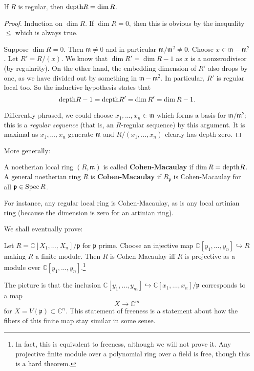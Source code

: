 \begin{example} 
If $R$ is regular, then $\mathrm{depth} R = \dim R$.
\end{example} 
\begin{proof} 
Induction on $\dim R$. If $\dim R=0$, then this is obvious by
the inequality
$\leq $ which is always true.

Suppose $\dim R = 0$. Then $\mathfrak{m} \neq 0$ and in
particular
$\mathfrak{m}/\mathfrak{m}^2 \neq 0$. Choose $x \in \mathfrak{m}
-
\mathfrak{m}^2$. Let $R'=R/(x)$. We know that $\dim R' = \dim
R-1$ as $x$ is a
nonzerodivisor (by regularity). On the other hand, the embedding
dimension of $R'$ also drops
by one, as we have divided out by something in $\mathfrak{m} -
\mathfrak{m}^2$.
In particular, $R'$ is regular local too. So the inductive
hypothesis states
that
\[\mathrm{depth} R-1 =  \mathrm{depth} R' = \dim R' = \dim R -1.   \]

Differently phrased, we could choose $x_1, \dots, x_n \in
\mathfrak{m}$ which forms a basis for
$\mathfrak{m}/\mathfrak{m}^2$; this is a
\emph{regular sequence} (that is, an $R$-regular sequence) by
this argument. It
is maximal as $x_1, \dots, x_n$ generate $\mathfrak{m}$ and
$R/(x_1, \dots,
x_n)$ clearly has depth zero.
\end{proof} 

More generally:
\begin{definition} 
A noetherian local ring $(R, \mathfrak{m})$ is called
\textbf{Cohen-Macaulay}
if $\dim R = \mathrm{depth} R$. A general noetherian ring $R$ is
\textbf{Cohen-Macaulay} if
$R_{\mathfrak{p}}$ is Cohen-Macaulay for all $\mathfrak{p} \in
\operatorname{Spec} R$.
\end{definition} 
For instance, any regular local ring is Cohen-Macaulay, as is
any local
artinian ring (because the dimension is zero for an artinian
ring).

We shall eventually prove:

\begin{proposition} 
Let $R = \mathbb{C}[X_1, \dots, X_n]/\mathfrak{p}$ for
$\mathfrak{p}$ prime.
Choose an injective map $\mathbb{C}[y_1, \dots, y_n]
\hookrightarrow R$ making $R$ a
finite module. Then $R$ is Cohen-Macaulay iff $R$ is projective
as a module
over $\mathbb{C}[y_1, \dots, y_n]$.\footnote{In fact, this is
equivalent to
freeness, although we will not prove it. Any projective finite
module over a
polynomial ring over a field is free, though this is a hard
theorem.}
\end{proposition} 

The picture is that the inclusion $\mathbb{C}[y_1, \dots, y_m ]
\hookrightarrow
\mathbb{C}[x_1, \dots, x_n]/\mathfrak{p}$ corresponds to a map 
\[ X \to \mathbb{C}^m  \]
for $X = V(\mathfrak{p}) \subset \mathbb{C}^n$. This statement
of freeness is a
statement about how the fibers of this finite map stay similar
in some sense.

